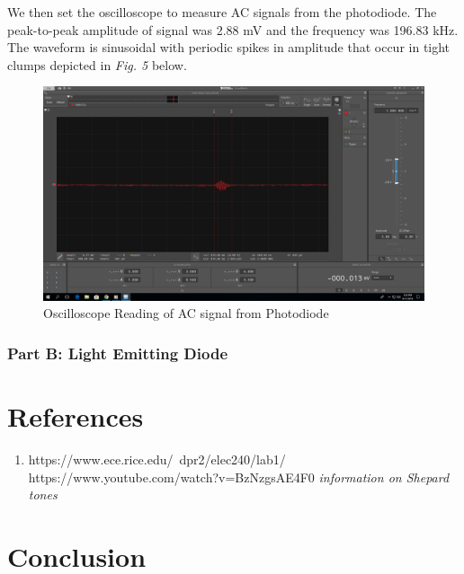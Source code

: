 \documentclass[10pt]{article}
\begin{document}
We then set the oscilloscope to measure AC signals from the photodiode. The peak-to-peak amplitude of signal was 2.88 mV and the frequency was 196.83 kHz. The waveform is sinusoidal with periodic spikes in amplitude that occur in tight clumps depicted in \textit{Fig. 5} below. 
\begin{center}
	\begin{figure}
		\centering
		\includegraphics[scale = 0.22]{images/zoom.png}
		\caption{Oscilloscope Reading of AC signal from Photodiode}
	\end{figure}
\end{center}

\subsubsection{Part B: Light Emitting Diode}


\medskip


\section{References}

	\begin{enumerate}
		\item https://www.ece.rice.edu/~dpr2/elec240/lab1/
		https://www.youtube.com/watch?v=BzNzgsAE4F0 \textit{information on Shepard tones}
	\end{enumerate}
\medskip


\section{Conclusion}
\end{document}
